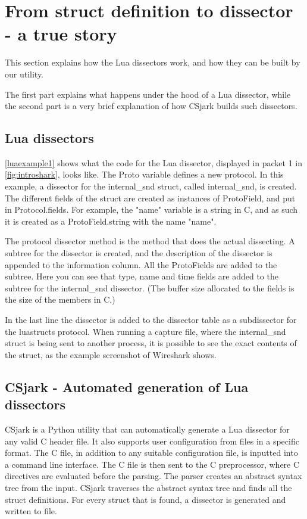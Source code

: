 \section*{From struct definition to dissector - a true story}
This section explains how the Lua dissectors work, and how they can be built by our utility.

The first part explains what happens under the hood of a Lua dissector, while 
the second part is a very brief explanation of how CSjark builds such dissectors.

\subsection*{Lua dissectors}

\autoref{luaexample1} shows what the code for the Lua dissector, displayed in packet 1 in \autoref{fig:introshark}, looks like.
The Proto variable defines a new protocol. In this example, a dissector for the internal\_snd struct, called internal\_snd, is created. 
The different fields of the struct are created as instances of ProtoField, and put in Protocol.fields.
For example, the "name" variable is a string in C, and as such it is created as a ProtoField.string with the 
name "name".

The protocol dissector method is the method that does the actual dissecting.
A subtree for the dissector is created, and the description of the dissector is appended to the information column.
All the ProtoFields are added to the subtree. Here you can see that type, name and time fields are added to the subtree for the internal\_snd dissector.
(The buffer size allocated to the fields is the size of the members in C.)

In the last line the dissector is added to the dissector table as a subdissector for the luastructs protocol.
When running a capture file, where the internal\_snd struct is being sent to another process, it is possible to see the exact contents of the struct, as the example screenshot of Wireshark shows.



\subsection*{CSjark - Automated generation of Lua dissectors}
CSjark is a Python utility that can automatically generate a Lua dissector for 
any valid C header file. It also supports user configuration from files in a specific format.
The C file, in addition to any suitable configuration file, is inputted into a command line interface.
The C file is then sent to the C preprocessor, where C directives are evaluated before the parsing.
The parser creates an abstract syntax tree from the input.
CSjark traverses the abstract syntax tree and finds all the struct definitions.
For every struct that is found, a dissector is generated and written to file.






